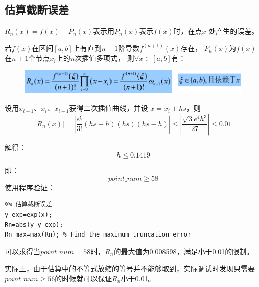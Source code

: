 \documentclass[a4paper,12pt]{ctexart}
\begin{document}
\subsection{估算截断误差}
$R_n(x)=f(x)-P_n(x)$表示用$P_n(x)$表示$f(x)$时，在点$x$
处产生的误差。
\par
若$f(x)$在区间$[a,b]$上有直到$n+1$阶导数$f^{(n+1)}(x)$存在，
$P_n(x)$为$f(x)$在$n+1$个节点$x_i$上的$n$次插值多项式，
则$\forall x\in [a,b]$有：
\begin{figure}[H]
    \centering
    \includegraphics[width=13cm]{上机4/wucha.png}
\end{figure}
\par
设用$x_{i-1}$、$x_{i}$、$x_{i+1}$获得二次插值曲线，并设
$x=x_{i}+hs$，则
\begin{equation}
    |R_n(x)|=|\frac{e^\xi}{3!}(hs+h)(hs)(hs-h)|\leq
    |\frac{\sqrt{3}e^4h^3}{27}|\leq 0.01
\end{equation}
\par
解得：
\begin{equation}
    h\leq 0.1419
\end{equation}
\par
即：
\begin{equation}
    point\_num\geq 58
\end{equation}
使用程序验证：
\begin{lstlisting}
%% 估算截断误差
y_exp=exp(x);
Rn=abs(y-y_exp);
Rn_max=max(Rn); % Find the maximum truncation error
\end{lstlisting}
\par
可以求得当$point\_num=58$时，$R_n$的最大值为0.008598，满足小于0.01的限制。
\par
实际上，由于估算中的不等式放缩的等号并不能够取到，实际调试时发现只需要
$point\_num\geq 56$的时候就可以保证$R_n$小于0.01。
\end{document}
